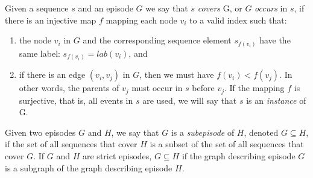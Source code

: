 \begin{definition}
Given a sequence $ s $ and an episode $ G $ we say that $ s $ \emph{covers} G, or $ G $ \emph{occurs} in $ s $, if there is an injective map $ f $ mapping each node $ v_i $ to a valid index such that:
\begin{enumerate}
\item the node $ v_i $ in $ G $ and the corresponding sequence element $ s_{f(v_i)} $ have the same label: $ s_{f(v_i)} = lab(v_i) $, and
\item if there is an edge $ (v_i, v_j) $ in $ G $, then we must have $ f(v_i) < f(v_j) $. In other words, the parents of $ v_j $ must occur in $ s $ before $ v_j $. If the mapping $ f $ is surjective, that is, all events in $ s $ are used, we will say that $ s $ is an \emph{instance} of G.
\end{enumerate}
\end{definition}

\begin{definition}
Given two episodes $ G $ and $ H $, we say that $ G $ is a \emph{subepisode} of $ H $, denoted $ G \subseteq H $, if the set of all sequences that cover $ H $ is a subset of the set of all sequences that cover $ G $. If $ G $ and $ H $ are strict episodes, $ G \subseteq H $ if the graph describing episode $ G $ is a subgraph of the graph describing episode $ H $.
\end{definition}

